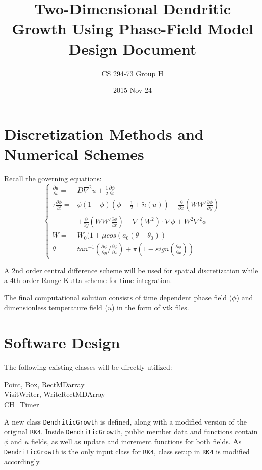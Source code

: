 \documentclass{article}
\title{Two-Dimensional Dendritic Growth Using Phase-Field Model \\ Design Document}
\date{2015-Nov-24}
\author{CS 294-73 Group H}
\begin{document}
\maketitle
    
\section{Discretization Methods and Numerical Schemes}
Recall the governing equations:
\begin{equation}
\begin{cases}
\frac{\partial u}{\partial t} =&D\nabla^2u+\frac{1}{2}\frac{\partial\phi}{\partial t} \\
\tau\frac{\partial \phi}{\partial t} =&  \phi(1-\phi)(\phi-\frac{1}{2}+\tilde{n}(u)) - \frac{\partial}{\partial x}(WW'\frac{\partial\phi}{\partial y})\\
&  + \frac{\partial}{\partial y}(WW'\frac{\partial\phi}{\partial x}) + \nabla(W^2)\cdot\nabla\phi + W^2\nabla^2\phi \\
W = & W_0(1+\mu cos(a_0(\theta-\theta_0)) \\
\theta = & tan^{-1}(\frac{\partial\phi}{\partial y}/\frac{\partial\phi}{\partial x}) + \pi(1-sign(\frac{\partial\phi}{\partial x})) 
\end{cases}
\end{equation}

A 2nd order central difference scheme will be used for spatial discretization while a 4th order Runge-Kutta scheme for time integration. 

The final computational solution consists of time dependent phase field ($\phi$) and dimensionless temperature field ($u$) in the form of vtk files.

\section{Software Design}
The following existing classes will be directly utilized:
\begin{description}
\item[Point, Box, RectMDarray]
\item[VisitWriter, WriteRectMDArray]
\item[CH\_Timer]
\end{description}
A new class \texttt{DendriticGrowth} is defined, along with a modified version of the original \texttt{RK4}. Inside \texttt{DendriticGrowth}, public member data and functions contain $\phi$ and $u$ fields, as well as update and increment functions for both fields. As \texttt{DendriticGrowth} is the only input class for \texttt{RK4}, class setup in \texttt{RK4} is modified accordingly. 
\end{document}
